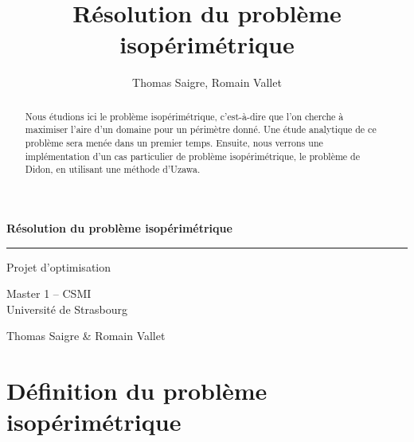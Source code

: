 \documentclass[10pt,a4paper]{article}
\title{Résolution du problème isopérimétrique}
\author{Thomas Saigre, Romain Vallet}
\theoremstyle{plain}
\theoremstyle{definition}
\begin{document}
\renewcommand{\proofname}{\textbf{Preuve}}



\thispagestyle{empty}



\begin{center}

{\LARGE \textsf{\textbf{Résolution du problème isopérimétrique\\}}}
\rule{\linewidth}{0.5mm}


{\Large Projet d'optimisation}

\vspace{\baselineskip}

{\Large Master 1 -- CSMI \\ \vspace{0.5\baselineskip} Université de Strasbourg}


{\sf \Large Thomas Saigre \& Romain Vallet}

\vspace{2\baselineskip}

\end{center}





\newpage

\begin{abstract}
Nous étudions ici le problème isopérimétrique, c'est-à-dire que l'on cherche à maximiser l'aire d'un domaine pour un périmètre donné. Une étude analytique de ce problème sera menée dans un premier temps. Ensuite, nous verrons une implémentation d'un cas particulier de problème isopérimétrique, le problème de Didon, en utilisant une méthode d'Uzawa.
\end{abstract}





\section{Définition du problème isopérimétrique}
\end{document}

